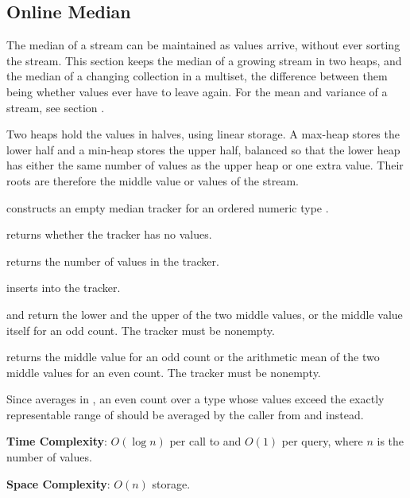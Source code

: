 \subsection{Online Median}
\label{sec:1.6.5}
The median of a stream can be maintained as values arrive, without ever sorting the stream. This section keeps the median of a growing stream in two heaps, and the median of a changing collection in a multiset, the difference between them being whether values ever have to leave again. For the mean and variance of a stream, see section .

Two heaps hold the values in halves, using linear storage. A max-heap stores the lower half and a min-heap stores the upper half, balanced so that the lower heap has either the same number of values as the upper heap or one extra value. Their roots are therefore the middle value or values of the stream.

\begin{compactitem}
  \item {} constructs an empty median tracker for an ordered numeric type .
  \item {} returns whether the tracker has no values.
  \item {} returns the number of values in the tracker.
  \item {} inserts  into the tracker.
  \item {} and  return the lower and the upper of the two middle values, or the middle value itself for an odd count. The tracker must be nonempty.
  \item {} returns the middle value for an odd count or the arithmetic mean of the two middle values for an even count. The tracker must be nonempty.
\end{compactitem}

Since  averages in , an even count over a type whose values exceed the exactly representable range of  should be averaged by the caller from  and  instead.

\textbf{Time Complexity}: $O(\log n)$ per call to  and $O(1)$ per query, where $n$ is the number of values.

\textbf{Space Complexity}: $O(n)$ storage.

